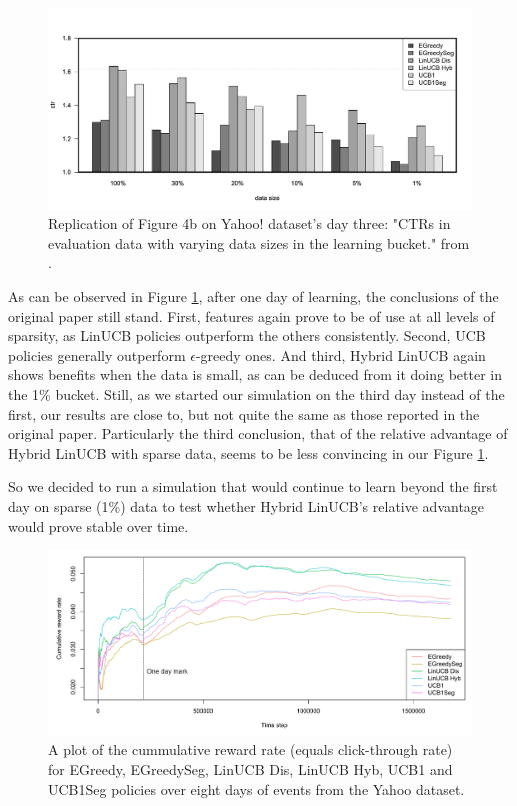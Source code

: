 \documentclass{jss}
\begin{document}
\begin{figure}[H]
  \centering
    \includegraphics[width=.99\textwidth]{fig/ctr_comparison}
      \caption{Replication of Figure 4b on Yahoo! dataset's day three: "CTRs in evaluation data with varying data sizes in the learning bucket." from \cite{Li2010}.}
      \label{fig:ctr_comparison}
\end{figure}

As can be observed in Figure \ref{fig:ctr_comparison}, after one day of learning, the conclusions of the original paper still stand. First, features again prove to be of use at all levels of sparsity, as LinUCB policies outperform the others consistently. Second, UCB policies generally outperform $\epsilon$-greedy ones. And third, Hybrid LinUCB again shows benefits when the data is small, as can be deduced from it doing better in the 1\% bucket. Still, as we started our simulation on the third day instead of the first, our results are close to, but not quite the same as those reported in the original paper. Particularly the third conclusion, that of the relative advantage of Hybrid LinUCB with sparse data, seems to be less convincing in our Figure \ref{fig:ctr_comparison}.

So we decided to run a simulation that would continue to learn beyond the first day on sparse (1\%) data to test whether Hybrid LinUCB's relative advantage would prove stable over time.

\begin{figure}[H]
  \centering
    \includegraphics[width=.99\textwidth]{fig/one_day}
      \caption{A plot of the cummulative reward rate (equals click-through rate) for EGreedy, EGreedySeg, LinUCB Dis, LinUCB Hyb, UCB1 and UCB1Seg policies over eight days of events from the Yahoo dataset.}
      \label{fig:one_day}
\end{figure}
\end{document}
